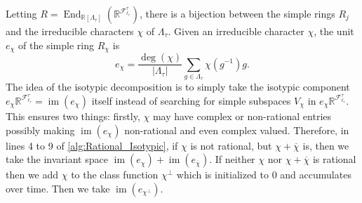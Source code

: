 \documentclass[a4paper,11pt]{article}
\numberwithin{equation}{section}
\newcommand{\mF}{\mathcal{F}}
\newcommand{\RR}{\mathbb{R}}
\begin{document}
    
    Letting $R = \operatorname{End}_{\mathbb R[\Lambda_\tau]}(\RR^{\mF^{\tau}_{\ell_\tau}})$, there is a bijection between the simple rings $R_j$ and the irreducible characters $\chi$ of $\Lambda_\tau$. Given an irreducible character $\chi$,
    the unit $e_\chi$ of the simple ring $R_\chi$ is
    \[
        e_\chi = \frac{\operatorname{deg}(\chi)}{|\Lambda_\tau|}\sum_{g\in \Lambda_\tau} \chi(g^{-1}) g.
    \]
    The idea of the isotypic decomposition is to simply take the isotypic component $e_\chi\mathbb R^{\mF^\tau_{\ell_\tau}} = \operatorname{im}(e_\chi)$ itself instead of searching for simple subspaces $V_\chi$ in $e_\chi\mathbb R^{\mF^\tau_{\ell_\tau}}$.
    This ensures two things: firstly, $\chi$ may have complex or non-rational entries possibly making $\operatorname{im}(e_\chi)$ non-rational and even complex valued. Therefore, in lines 4 to 9 of \cref{alg:Rational_Isotypic}, if $\chi$ is not rational, but $\chi+\overline{\chi}$ is, then we take the invariant space $\operatorname{im}(e_\chi) + \operatorname{im}(e_{\overline{\chi}})$. If neither $\chi$ nor $\chi+\overline{\chi}$ is rational then we add $\chi$ to the class function $\chi^\bot$ which is initialized to $0$ and accumulates over time. Then we take $\operatorname{im}(e_{\chi^\bot})$.
\end{document}
